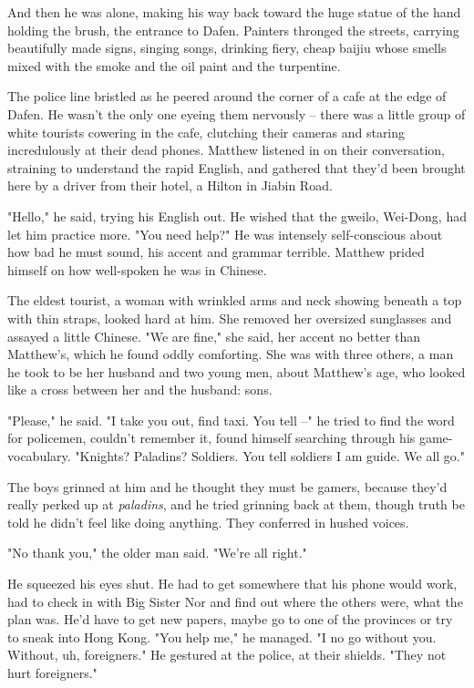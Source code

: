 And then he was alone, making his way back toward the huge statue
of the hand holding the brush, the entrance to Dafen. Painters
thronged the streets, carrying beautifully made signs, singing
songs, drinking fiery, cheap baijiu whose smells mixed with the
smoke and the oil paint and the turpentine.

The police line bristled as he peered around the corner of a cafe
at the edge of Dafen. He wasn't the only one eyeing them nervously
-- there was a little group of white tourists cowering in the cafe,
clutching their cameras and staring incredulously at their dead
phones. Matthew listened in on their conversation, straining to
understand the rapid English, and gathered that they'd been brought
here by a driver from their hotel, a Hilton in Jiabin Road.

"Hello," he said, trying his English out. He wished that the
gweilo, Wei-Dong, had let him practice more. "You need help?" He
was intensely self-conscious about how bad he must sound, his
accent and grammar terrible. Matthew prided himself on how
well-spoken he was in Chinese.

The eldest tourist, a woman with wrinkled arms and neck showing
beneath a top with thin straps, looked hard at him. She removed her
oversized sunglasses and assayed a little Chinese. "We are fine,"
she said, her accent no better than Matthew's, which he found oddly
comforting. She was with three others, a man he took to be her
husband and two young men, about Matthew's age, who looked like a
cross between her and the husband: sons.

"Please," he said. "I take you out, find taxi. You tell --" he
tried to find the word for policemen, couldn't remember it, found
himself searching through his game-vocabulary. "Knights? Paladins?
Soldiers. You tell soldiers I am guide. We all go."

The boys grinned at him and he thought they must be gamers, because
they'd really perked up at \emph{paladins}, and he tried grinning
back at them, though truth be told he didn't feel like doing
anything. They conferred in hushed voices.

"No thank you," the older man said. "We're all right."

He squeezed his eyes shut. He had to get somewhere that his phone
would work, had to check in with Big Sister Nor and find out where
the others were, what the plan was. He'd have to get new papers,
maybe go to one of the provinces or try to sneak into Hong Kong.
"You help me," he managed. "I no go without you. Without, uh,
foreigners." He gestured at the police, at their shields. "They not
hurt foreigners."

